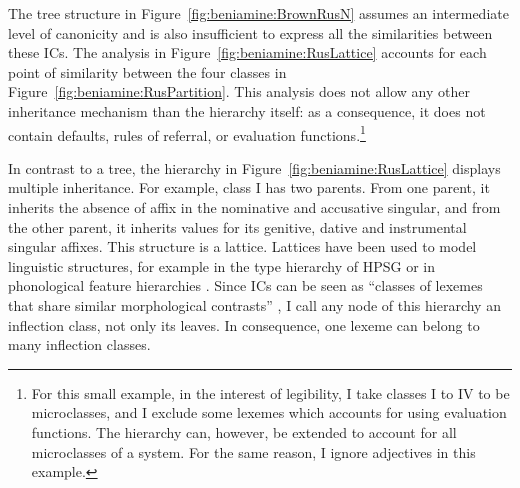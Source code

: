 \documentclass[output=paper]{langscibook}
\begin{document}
    The tree structure in Figure~\ref{fig:beniamine:BrownRusN} assumes an intermediate level of canonicity and is also insufficient to express all the similarities between these ICs. The analysis in Figure~\ref{fig:beniamine:RusLattice} accounts for each point of similarity between the four classes in Figure~\ref{fig:beniamine:RusPartition}. This analysis does not allow any other inheritance mechanism than the hierarchy itself: as a consequence, it does not contain defaults, rules of referral, or evaluation functions.\footnote{For this small example, in the interest of legibility, I take classes I to IV to be microclasses, and I exclude some lexemes which \citet{Brown1998} accounts for using evaluation functions. The hierarchy can, however, be extended to account for all microclasses of a system. For the same reason, I ignore adjectives in this example.}
    
    In contrast to a tree, the hierarchy in Figure~\ref{fig:beniamine:RusLattice} displays multiple inheritance. For example, class I has two parents. From one parent, it inherits the absence of affix in the nominative and accusative singular, and from the other parent, it inherits values for its genitive, dative and instrumental singular affixes. This structure is a lattice. Lattices have been used to model linguistic structures, for example in the type hierarchy of HPSG \citep{Flickinger1987,PollardSag1994,GinzburgSag2000} or in phonological feature hierarchies \citep{ChomskyHalle1968,Frisch1997}. Since ICs can be seen as ``classes of lexemes that share similar morphological contrasts'' \citep[~4]{BrownHippisley2012}, I call any node of this hierarchy an inflection class, not only its leaves. In consequence, one lexeme can belong to many inflection classes.
    
\end{document}
